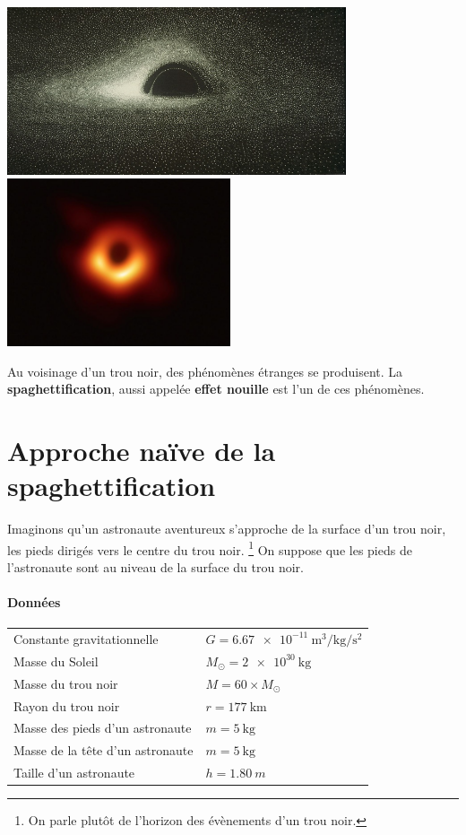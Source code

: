 \documentclass[12pt,a4paper,fleqn]{article}
\begin{document}
\begin{center}
\includegraphics[height=140pt]{images/blackhole_luminet.jpg} \hfill
\includegraphics[height=140pt]{images/blackhole_photo.jpg}
\end{center}

Au voisinage d'un trou noir, des phénomènes étranges se produisent.
La \textbf{spaghettification}, aussi appelée \og \textbf{effet nouille} \fg{} est l'un de ces phénomènes.

\section*{Approche \og naïve \fg{} de la spaghettification}

Imaginons qu'un astronaute aventureux s'approche de la \og surface \fg{} d'un trou noir, les pieds dirigés vers le centre du trou noir. \footnote{On parle plutôt de l'horizon des évènements d'un trou noir.}
On suppose que les pieds de l'astronaute sont au niveau de la surface du trou noir.

\paragraph{Données}
\begin{center}
\begin{tabular}{ll}
Constante gravitationnelle & $G = \qty[per-mode=power]{6.67e-11}{\meter\cubed\per\kilogram\per\second\squared}$ \\
Masse du Soleil & $M_\odot = \qty{2e30}{\kilogram}$ \\
Masse du trou noir & $M = 60 \times M_\odot$ \\
Rayon du trou noir & $r = \qty{177}{\kilo\meter} $ \\
Masse des pieds d'un astronaute & $m = \qty{5}{\kilogram}$ \\
Masse de la tête d'un astronaute & $m = \qty{5}{\kilogram}$ \\
Taille d'un astronaute & $h = \qty{1.80}{m}$
\end{tabular}
\end{center}
\end{document}
